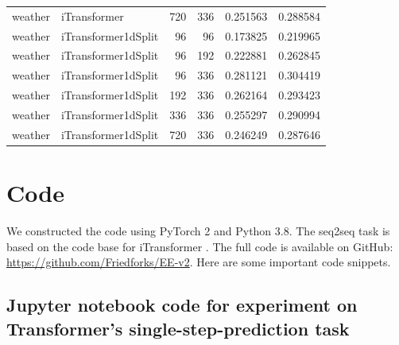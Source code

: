 \documentclass[stu,12pt,floatsintext]{apa7}
\begin{document}
\begin{longtable}{llrrrr}
     weather &        iTransformer &           720 &            336 & 0.251563 & 0.288584 \\
     weather & iTransformer1dSplit &            96 &             96 & 0.173825 & 0.219965 \\
     weather & iTransformer1dSplit &            96 &            192 & 0.222881 & 0.262845 \\
     weather & iTransformer1dSplit &            96 &            336 & 0.281121 & 0.304419 \\
     weather & iTransformer1dSplit &           192 &            336 & 0.262164 & 0.293423 \\
     weather & iTransformer1dSplit &           336 &            336 & 0.255297 & 0.290994 \\
     weather & iTransformer1dSplit &           720 &            336 & 0.246249 & 0.287646 \\
\end{longtable}

\section{Code}
We constructed the code using PyTorch 2 and Python 3.8. The seq2seq task is based on the code base for iTransformer \cite{liu2023itransformer}. The full code is available on GitHub: \url{https://github.com/Friedforks/EE-v2}. Here are some important code snippets. 

\subsection{Jupyter notebook code for experiment on Transformer's single-step-prediction task}
\end{document}
